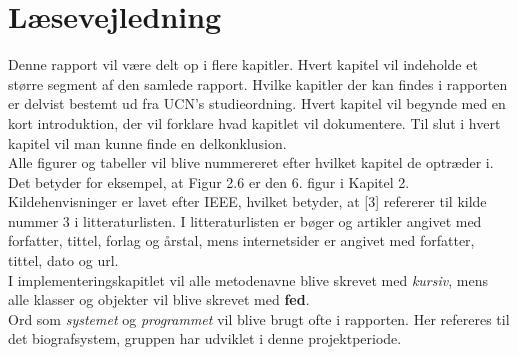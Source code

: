 \newpage
\section*{Læsevejledning}
Denne rapport vil være delt op i flere kapitler. Hvert kapitel vil indeholde et større segment af den samlede rapport.
Hvilke kapitler der kan findes i rapporten er delvist bestemt ud fra UCN's studieordning. 
Hvert kapitel vil begynde med en kort introduktion, der vil forklare hvad kapitlet vil dokumentere. 
Til slut i hvert kapitel vil man kunne finde en delkonklusion.\\ 

Alle figurer og tabeller vil blive nummereret efter hvilket kapitel de optræder i. Det betyder for eksempel, at Figur 2.6 er den 
6. figur i Kapitel 2. \\

Kildehenvisninger er lavet efter IEEE, hvilket betyder, at [3] refererer til kilde nummer 3 i litteraturlisten. 
I litteraturlisten er bøger og artikler angivet med forfatter, tittel, forlag og årstal, mens internetsider er angivet med forfatter, tittel, dato og url. \\ 

I implementeringskapitlet vil alle metodenavne blive skrevet med \textit{kursiv}, mens alle klasser og objekter vil blive skrevet med \textbf{fed}.\\

Ord som \textit{systemet} og \textit{programmet} vil blive brugt ofte i rapporten. Her refereres til det biografsystem, gruppen har udviklet i denne projektperiode.